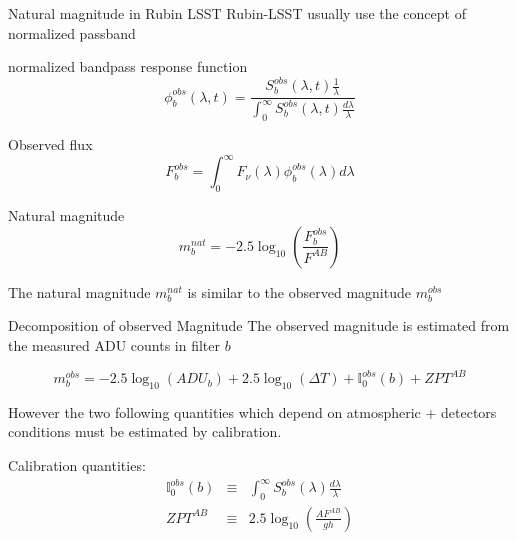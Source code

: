 \documentclass{beamer}
\begin{document}
\begin{frame}{Natural magnitude in Rubin LSST}
Rubin-LSST usually use the concept of normalized passband
\begin{alertblock}{normalized bandpass response function}
\begin{equation}
\phi_b^{obs} (\lambda,t) = \frac{S_b^{obs}(\lambda,t)\frac{1}{\lambda}}{\int_0^\infty S^{obs}_b(\lambda,t) \frac{d\lambda}{\lambda}}
\end{equation}
\end{alertblock}
\begin{block}{Observed flux}
\begin{equation}
F_b^{obs} = \int_0^\infty F_\nu(\lambda) \phi_b^{obs}(\lambda) d\lambda
\end{equation}
\end{block}
\begin{exampleblock}{Natural magnitude}
\begin{equation}
m_b^{nat} = -2.5 \log_{10} \left( \frac{F_b^{obs}}{F^{AB}}\right)
\end{equation}
\end{exampleblock}
The natural magnitude $m_b^{nat}$ is similar to  the observed magnitude $m_b^{obs}$
\end{frame}
\begin{frame}{Decomposition of observed Magnitude} 
The observed magnitude is estimated from the measured ADU counts in filter $b$
\begin{alertblock}{}
\begin{equation}
m^{obs}_b = -2.5 \log_{10}(ADU_b)+ 2.5 \log_{10}(\Delta T) + \mathbb{I}_0	^{obs}(b) + ZPT^{AB}
\end{equation}	
\end{alertblock}	
However the two following quantities which depend on atmospheric + detectors conditions must be estimated by calibration. 
\begin{block}{Calibration quantities:}
\begin{eqnarray}
\mathbb{I}_0^{obs}(b) & \equiv & \int_0^\infty S^{obs}_b(\lambda) \frac{d\lambda}{\lambda} \\
ZPT^{AB} & \equiv & 2.5 \log_{10} \left( \frac{A F^{AB}}{gh}\right)
\end{eqnarray} 
\end{block}

\end{frame}
\end{document}
